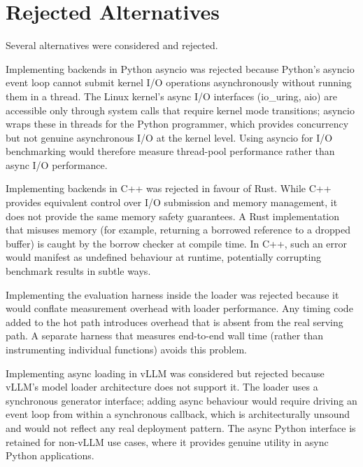 \section{Rejected Alternatives}

Several alternatives were considered and rejected.

Implementing backends in Python asyncio was rejected because Python's asyncio event loop cannot submit kernel I/O operations asynchronously without running them in a thread. The Linux kernel's async I/O interfaces (io\_uring, aio) are accessible only through system calls that require kernel mode transitions; asyncio wraps these in threads for the Python programmer, which provides concurrency but not genuine asynchronous I/O at the kernel level. Using asyncio for I/O benchmarking would therefore measure thread-pool performance rather than async I/O performance.

Implementing backends in C++ was rejected in favour of Rust. While C++ provides equivalent control over I/O submission and memory management, it does not provide the same memory safety guarantees. A Rust implementation that misuses memory (for example, returning a borrowed reference to a dropped buffer) is caught by the borrow checker at compile time. In C++, such an error would manifest as undefined behaviour at runtime, potentially corrupting benchmark results in subtle ways.

Implementing the evaluation harness inside the loader was rejected because it would conflate measurement overhead with loader performance. Any timing code added to the hot path introduces overhead that is absent from the real serving path. A separate harness that measures end-to-end wall time (rather than instrumenting individual functions) avoids this problem.

Implementing async loading in vLLM was considered but rejected because vLLM's model loader architecture does not support it. The loader uses a synchronous generator interface; adding async behaviour would require driving an event loop from within a synchronous callback, which is architecturally unsound and would not reflect any real deployment pattern. The async Python interface is retained for non-vLLM use cases, where it provides genuine utility in async Python applications.
